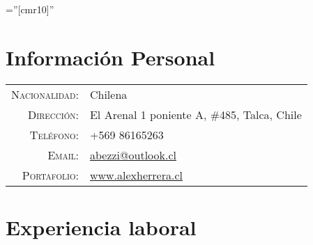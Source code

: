 \documentclass[a4paper,10pt]{article} %
\begin{document}
\pagestyle{empty} %

\font\fb=''[cmr10]'' %


\par{\bigskip\par} %

\section{Informaci\'on Personal}

\begin{tabular}{rl}
\textsc{Nacionalidad:} & Chilena \\
\textsc{Direcci\'on:} & El Arenal 1 poniente A, \#485, Talca, Chile \\
\textsc{Tel\'efono:} & +569 86165263\\
\textsc{Email:} & \href{mailto:abezzi@outlook.cl}{abezzi@outlook.cl}\\
\textsc{Portafolio:} & \href{https://alexherrera.cl/}{www.alexherrera.cl}
\end{tabular}



\section{Experiencia laboral}
\end{document}
